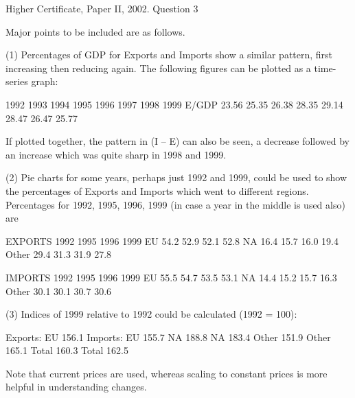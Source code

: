 Higher Certificate, Paper II, 2002.  Question 3 
 
 
Major points to be included are as follows. 
 
 
(1) Percentages of GDP for Exports and Imports show a similar pattern, first increasing then reducing again.  The following figures can be plotted as a time-series graph: 
 
  1992 1993 1994 1995 1996 1997 1998 1999 E/GDP 23.56 25.35 26.38 28.35 29.14 28.47 26.47 25.77         %
 
If plotted together, the pattern in (I – E) can also be seen, a decrease followed by an increase which was quite sharp in 1998 and 1999. 
 
 
(2) Pie charts for some years, perhaps just 1992 and 1999, could be used to show the percentages of Exports and Imports which went to different regions.  Percentages for 1992, 1995, 1996, 1999 (in case a year in the middle is used also) are 
 
EXPORTS 1992 1995 1996 1999 EU 54.2 52.9 52.1 52.8 NA 16.4 15.7 16.0 19.4 Other 29.4 31.3 31.9 27.8 
 
IMPORTS 1992 1995 1996 1999 EU 55.5 54.7 53.5 53.1 NA 14.4 15.2 15.7 16.3 Other 30.1 30.1 30.7 30.6 
 
 
(3) Indices of 1999 relative to 1992 could be calculated (1992 = 100): 
 
Exports: EU 156.1   Imports: EU 155.7   NA 188.8     NA 183.4   Other 151.9     Other 165.1 
   Total 160.3     Total 162.5 
 
 
 
Note that current prices are used, whereas scaling to constant prices is more helpful in understanding changes. 